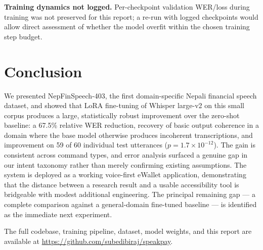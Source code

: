 \documentclass[11pt,a4paper]{article}
\begin{document}
\textbf{Training dynamics not logged.} Per-checkpoint validation WER/loss
during training was not preserved for this report; a re-run with logged
checkpoints would allow direct assessment of whether the model overfit
within the chosen training step budget.

\section{Conclusion}

We presented NepFinSpeech-403, the first domain-specific Nepali financial
speech dataset, and showed that LoRA fine-tuning of Whisper large-v2 on
this small corpus produces a large, statistically robust improvement over
the zero-shot baseline: a 67.5\% relative WER reduction, recovery of basic
output coherence in a domain where the base model otherwise produces
incoherent transcriptions, and improvement on 59 of 60 individual test
utterances ($p = 1.7\times10^{-12}$). The gain is consistent across command
types, and error analysis surfaced a genuine gap in our intent taxonomy
rather than merely confirming existing assumptions. The system is deployed
as a working voice-first eWallet application, demonstrating that the
distance between a research result and a usable accessibility tool is
bridgeable with modest additional engineering. The principal remaining gap
--- a complete comparison against a general-domain fine-tuned baseline ---
is identified as the immediate next experiment.

The full codebase, training pipeline, dataset, model weights, and this
report are available at
\url{https://github.com/subedibiraj/speakpay}.
\end{document}
